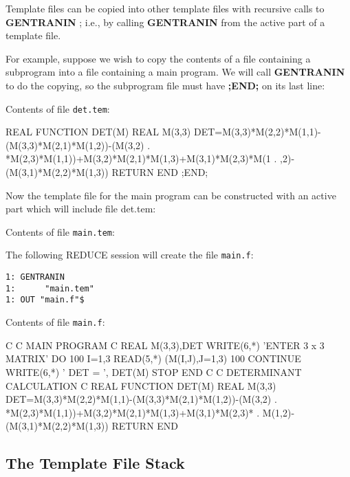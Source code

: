 
Template files can be copied into other template files with recursive
calls to {\bf GENTRANIN} ; i.e., by calling {\bf GENTRANIN} from the
active part of a template file.

For example, suppose we wish to copy the contents of a file containing
a subprogram into a file containing a main program.  We will call
{\bf GENTRANIN} to do the copying, so the subprogram file must
have {\bf ;END;} on its last line:

Contents of file {\tt det.tem}:
\begin{framedverbatim}
      REAL FUNCTION DET(M)
      REAL M(3,3)
      DET=M(3,3)*M(2,2)*M(1,1)-(M(3,3)*M(2,1)*M(1,2))-(M(3,2)
     . *M(2,3)*M(1,1))+M(3,2)*M(2,1)*M(1,3)+M(3,1)*M(2,3)*M(1
     . ,2)-(M(3,1)*M(2,2)*M(1,3))
      RETURN
      END
;END;
\end{framedverbatim}

Now the template file for the main program can be constructed
with an active part which will include file det.tem:

Contents of file {\tt main.tem}:

The following REDUCE session will create the file {\tt main.f}:
\begin{verbatim}
1: GENTRANIN
1:      "main.tem"
1: OUT "main.f"$
\end{verbatim}

Contents of file {\tt main.f}:
\begin{framedverbatim}
C
C  MAIN PROGRAM
C
      REAL M(3,3),DET
      WRITE(6,*) 'ENTER 3 x 3 MATRIX'
      DO 100 I=1,3
          READ(5,*) (M(I,J),J=1,3)
100   CONTINUE
      WRITE(6,*) ' DET = ', DET(M)
      STOP
      END
C
C  DETERMINANT CALCULATION
C
      REAL FUNCTION DET(M)
      REAL M(3,3)
      DET=M(3,3)*M(2,2)*M(1,1)-(M(3,3)*M(2,1)*M(1,2))-(M(3,2)
     . *M(2,3)*M(1,1))+M(3,2)*M(2,1)*M(1,3)+M(3,1)*M(2,3)*
     . M(1,2)-(M(3,1)*M(2,2)*M(1,3))
      RETURN
      END
\end{framedverbatim}

\subsection{The Template File Stack}
\label{template:stack}

